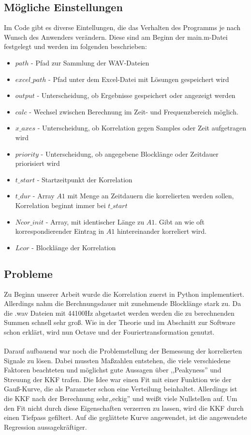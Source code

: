 \subsection{Mögliche Einstellungen}
Im Code gibt es diverse Eintellungen, die das Verhalten des Programms je nach Wunsch des Anwenders verändern. Diese sind am Beginn der main.m-Datei festgelegt und werden im folgenden beschrieben:
\begin{itemize} 
\item $path$ - Pfad zur Sammlung der WAV-Dateien
\item $excel\_path$ - Pfad unter dem Excel-Datei mit Lösungen gespeichert wird
\item $output$ - Unterscheidung, ob Ergebnisse gespeichert oder angezeigt werden
\item $calc$ - Wechsel zwischen Berechnung im Zeit- und Frequenzbereich möglich.
\item $x\_axes$ - Unterscheidung, ob Korrelation gegen Samples oder Zeit aufgetragen wird
\item $priority$ - Unterscheidung, ob angegebene Blocklänge oder Zeitdauer priorisiert wird
\item $t\_start$ - Startzeitpunkt der Korrelation
\item $t\_dur$ - Array $A1$ mit Menge an Zeitdauern die korrelierten werden sollen, Korrelation beginnt immer bei $t\_start$
\item $Ncor\_init$ - Array, mit identischer Länge zu $A1$. Gibt an wie oft korrespondierender Eintrag in $A1$ hintereinander korreliert wird. 
\item $Lcor$ - Blocklänge der Korrelation
\end{itemize}
\subsection{Probleme} 
Zu Beginn unserer Arbeit wurde die Korrelation zuerst in Python implementiert. Allerdings nahm die Berchnungsdauer mit zunehmende Blocklänge stark zu. Da die .wav Dateien mit 44100Hz abgetastet werden werden die zu berechnenden Summen schnell sehr groß. Wie in der Theorie und im Abschnitt zur Software schon erklärt, wird nun Octave und der Fouriertransformation genutzt. \\\\Darauf aufbauend war noch die Problemstellung der Bemessung der korrelierten Signale zu lösen. Dabei mussten Maßzahlen entstehen, die viele verschiedene Faktoren beachteten und möglichst gute Aussagen über ,,Peakyness'' und Streuung der KKF trafen. Die Idee war einen Fit mit einer Funktion wie der Gauß-Kurve, die als Parameter schon eine Verteilung beinhaltet. Allerdings ist die KKF nach der Berechnung sehr,,eckig'' und weißt viele Nullstellen auf. Um den Fit nicht durch diese Eigenschaften verzerren zu lassen, wird die KKF durch einen Tiefpass gefiltert. Auf die geglättete Kurve angewendet, ist die angewendete Regression aussagekräftiger.
